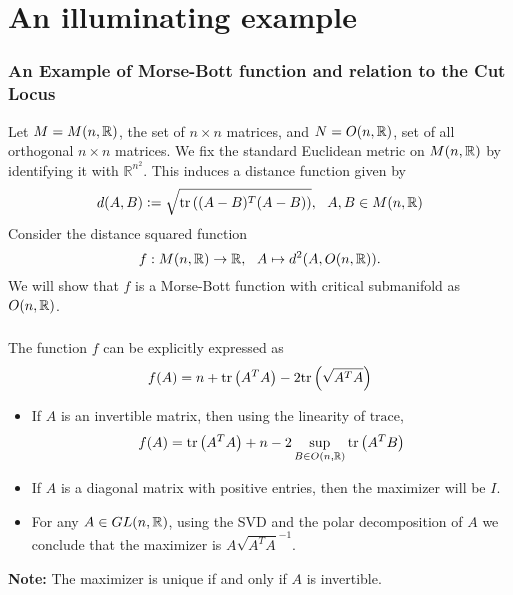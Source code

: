 \documentclass{beamer}
\begin{document}
	\section{An illuminating example}
	\begin{frame}
		\frametitle<presentation>{An Example of Morse-Bott function and relation to the Cut Locus}
		\p Let $ M = M(n,\mathbb{R}) $, the set of $n\times n$ matrices, and $ N=O(n,\mathbb{R}) $, set of all orthogonal $n\times n$ matrices. \p We fix the standard Euclidean metric on $M(n,\mathbb{R})$ by identifying it with $\mathbb{R}^{n^2}$. \p This induces a distance function given by
		\begin{equation*}
			d(A,B) \vcentcolon= \sqrt{\mathrm{tr}\left( (A-B)^T(A-B) \right)}, ~~A,B\in M(n,\mathbb{R})
		\end{equation*}
		\p
		Consider the distance squared function
		\begin{displaymath}
		f: M(n,\mathbb{R})\to \mathbb{R},~~ A\mapsto d^2(A, O(n,\mathbb{R})).
		\end{displaymath}
		\p We will show that $f$ is a Morse-Bott function with critical submanifold as $O(n,\mathbb{R})$.
	\end{frame}	

	\begin{frame}
		\frametitle<presentation>{}
		\begin{tcolorbox}[colback = white, colframe=red!50!yellow] 
			\textcolor[rgb]{0.4,0,0.7}{The function $f$ can be explicitly expressed as 
			\begin{displaymath}
				f(A) = n + \mathrm{tr}\left( A^TA \right) - 2\mathrm{tr}\left( \sqrt{A^TA} \right)
			\end{displaymath}}
			 \tcblower
			\begin{itemize}
				\p \item If $A$ is an invertible matrix, \p then using the linearity of $\mathrm{trace}$, 
				\begin{displaymath}
					f(A) = \mathrm{tr}\left( A^TA \right)+ n -2\sup_{B\in O(n,\mathbb{R})} \mathrm{tr}\left( A^TB \right)
				\end{displaymath}
				\p \item If $A$ is a diagonal matrix with positive entries, then the maximizer will be $I$.
				\p \item For any $A\in GL(n,\mathbb{R})$, using the SVD and the polar decomposition of $A$ we conclude that the maximizer is $A\sqrt{A^TA}^{-1}$.
			\end{itemize}
			\DrawLine

			\p \textbf{Note:} \textcolor[rgb]{0.5,0.7,0.1}{ The maximizer is unique if and only if $A$ is invertible.}
		\end{tcolorbox}
	\end{frame}	
\end{document}
